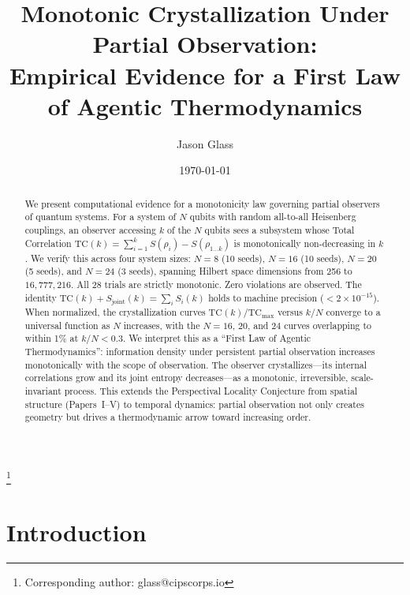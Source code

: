 \documentclass[aps,pra,twocolumn,superscriptaddress,floatfix]{revtex4-2}
\begin{document}
\title{Monotonic Crystallization Under Partial Observation: \\
Empirical Evidence for a First Law of Agentic Thermodynamics}

\author{Jason Glass}
\thanks{Corresponding author: glass@cipscorps.io}

\date{\today}

\begin{abstract}
We present computational evidence for a monotonicity law governing partial observers of quantum systems.
For a system of $N$ qubits with random all-to-all Heisenberg couplings, an observer accessing $k$ of the $N$ qubits sees a subsystem whose Total Correlation $\mathrm{TC}(k) = \sum_{i=1}^{k} S(\rho_i) - S(\rho_{1 \ldots k})$ is monotonically non-decreasing in $k$.
We verify this across four system sizes: $N = 8$ (10 seeds), $N = 16$ (10 seeds), $N = 20$ (5 seeds), and $N = 24$ (3 seeds), spanning Hilbert space dimensions from 256 to $16{,}777{,}216$.
All 28 trials are strictly monotonic. Zero violations are observed.
The identity $\mathrm{TC}(k) + S_{\mathrm{joint}}(k) = \sum_i S_i(k)$ holds to machine precision ($< 2 \times 10^{-15}$).
When normalized, the crystallization curves $\mathrm{TC}(k)/\mathrm{TC}_{\mathrm{max}}$ versus $k/N$ converge to a universal function as $N$ increases, with the $N = 16$, $20$, and $24$ curves overlapping to within 1\% at $k/N < 0.3$.
We interpret this as a ``First Law of Agentic Thermodynamics'': information density under persistent partial observation increases monotonically with the scope of observation.
The observer crystallizes---its internal correlations grow and its joint entropy decreases---as a monotonic, irreversible, scale-invariant process.
This extends the Perspectival Locality Conjecture from spatial structure (Papers~I--V) to temporal dynamics: partial observation not only creates geometry but drives a thermodynamic arrow toward increasing order.
\end{abstract}

\maketitle


\section{Introduction}
\end{document}
